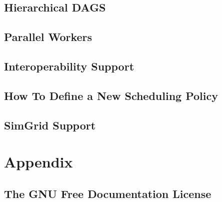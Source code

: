 \chapter{Hierarchical DAGS}
\label{HierarchicalDAGS}
\hypertarget{HierarchicalDAGS}{}


\chapter{Parallel Workers}
\label{ParallelWorker}
\hypertarget{ParallelWorker}{}


\chapter{Interoperability Support}
\label{InteropSupport}
\hypertarget{InteropSupport}{}


\chapter{How To Define a New Scheduling Policy}
\label{HowToDefineANewSchedulingPolicy}
\hypertarget{HowToDefineANewSchedulingPolicy}{}


\chapter{SimGrid Support}
\label{SimGridSupport}
\hypertarget{SimGridSupport}{}


\part{Appendix}

\chapter{The GNU Free Documentation License}
\label{GNUFreeDocumentationLicense}
\hypertarget{GNUFreeDocumentationLicense}{}




